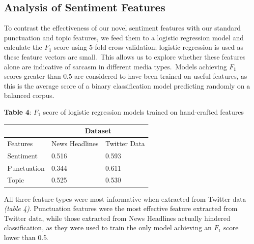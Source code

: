 \documentclass[12pt,a4paper]{article}
\begin{document}
\subsection{Analysis of Sentiment Features}\vspace{-5pt}
\noindent To contrast the effectiveness of our novel sentiment features with our standard punctuation and topic features, we feed them to a logistic regression model and calculate the $F_1$ score using 5-fold cross-validation; logistic regression is used as these feature vectors are small.\ This allows us to explore whether these features alone are indicative of sarcasm in different media types.\ Models achieving $F_1$ scores greater than 0.5 are considered to have been trained on useful features, as this is the average score of a binary classification model predicting randomly on a balanced corpus.\\\vspace{-5pt}


\hspace{-20pt}\begin{minipage}{0.50\textwidth}
	\begin{center}
		\noindent \textbf{Table 4}: $F_1$ score of logistic regression models trained on hand-crafted features\vspace{5pt}
		\begin{tabular}{|p{2cm}||p{2.8cm}|p{2.2cm}|}
			\hline
			& \multicolumn{2}{c|}{Dataset} \\
			\hline
			Features & News Headlines & Twitter Data\\
			\hline\hline
			Sentiment & 0.516 & 0.593\\
			\hline
			Punctuation & 0.344 & 0.611\\
			\hline
			Topic & 0.525 & 0.530\\
			\hline
		\end{tabular}
	\end{center}	
\end{minipage}\hspace{15pt}
\begin{minipage}{0.46\textwidth}
\noindent All three feature types were most informative when extracted from Twitter data \textit{(table 4)}. Punctuation features were the most effective feature extracted from Twitter data, while those extracted from News Headlines actually hindered classification, as they were used to train the only model achieving an $F_1$ score lower than 0.5.
\end{minipage}\vspace{8pt}
\end{document}
